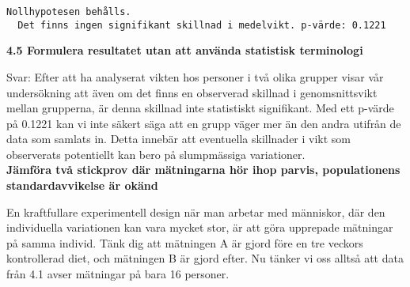 \documentclass[
  letterpaper,
  DIV=11,
  numbers=noendperiod]{scrartcl}
\newenvironment{Shaded}{\begin{snugshade}}{\end{snugshade}}
\newcommand{\AttributeTok}[1]{\textcolor[rgb]{0.40,0.45,0.13}{#1}}
\newcommand{\ConstantTok}[1]{\textcolor[rgb]{0.56,0.35,0.01}{#1}}
\newcommand{\ControlFlowTok}[1]{\textcolor[rgb]{0.00,0.23,0.31}{\textbf{#1}}}
\newcommand{\DecValTok}[1]{\textcolor[rgb]{0.68,0.00,0.00}{#1}}
\newcommand{\FloatTok}[1]{\textcolor[rgb]{0.68,0.00,0.00}{#1}}
\newcommand{\FunctionTok}[1]{\textcolor[rgb]{0.28,0.35,0.67}{#1}}
\newcommand{\NormalTok}[1]{\textcolor[rgb]{0.00,0.23,0.31}{#1}}
\newcommand{\OtherTok}[1]{\textcolor[rgb]{0.00,0.23,0.31}{#1}}
\newcommand{\SpecialCharTok}[1]{\textcolor[rgb]{0.37,0.37,0.37}{#1}}
\newcommand{\StringTok}[1]{\textcolor[rgb]{0.13,0.47,0.30}{#1}}
\begin{document}
\begin{Shaded}
\end{Shaded}

\begin{verbatim}
Nollhypotesen behålls.
  Det finns ingen signifikant skillnad i medelvikt. p-värde: 0.1221
\end{verbatim}

\textbf{4.5 Formulera resultatet utan att använda statistisk
terminologi}

\hfill\break
Svar: Efter att ha analyserat vikten hos personer i två olika grupper
visar vår undersökning att även om det finns en observerad skillnad i
genomsnittsvikt mellan grupperna, är denna skillnad inte statistiskt
signifikant. Med ett p-värde på 0.1221 kan vi inte säkert säga att en
grupp väger mer än den andra utifrån de data som samlats in. Detta
innebär att eventuella skillnader i vikt som observerats potentiellt kan
bero på slumpmässiga variationer.\\

\textbf{Jämföra två stickprov där mätningarna hör ihop parvis,
populationens standardavvikelse är okänd}

En kraftfullare experimentell design när man arbetar med människor, där
den individuella variationen kan vara mycket stor, är att göra upprepade
mätningar på samma individ. Tänk dig att mätningen A är gjord före en
tre veckors kontrollerad diet, och mätningen B är gjord efter. Nu tänker
vi oss alltså att data från 4.1 avser mätningar på bara 16 personer.
\end{document}
